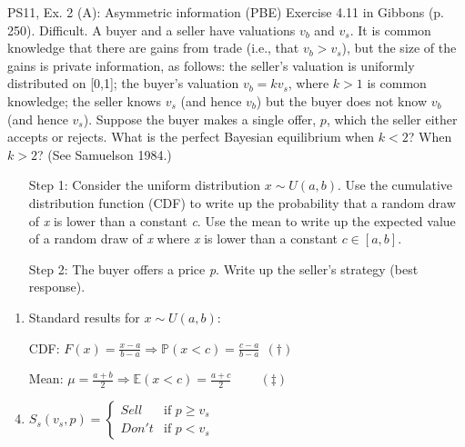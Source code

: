 \begin{frame}{PS11, Ex. 2 (A): Asymmetric information (PBE)}
    Exercise 4.11 in Gibbons (p. 250). Difficult. A buyer and a seller have valuations $v_b$ and $v_s$. It is common knowledge that there are gains from trade (i.e., that $v_b > v_s$), but the size of the gains is private information, as follows: the seller’s valuation is uniformly distributed on [0,1]; the buyer’s valuation $v_b = kv_s$, where $k > 1$ is common knowledge; the seller knows $v_s$ (and hence $v_b$) but the buyer does not know $v_b$ (and hence $v_s$). Suppose the buyer makes a single offer, $p$, which the seller either accepts or rejects. What is the perfect Bayesian equilibrium when $k < 2$? When $k > 2$? (See Samuelson 1984.) \vspace{-8pt}
    \begin{multicols}{2}
      \begin{itemize}
        \item[Step 1:] Consider the uniform distribution $x\sim U(a, b)$. Use the cumulative distribution function (CDF) to write up the probability that a random draw of \textit{x} is lower than a constant \textit{c}. Use the mean to write up the expected value of a random draw of \textit{x} where \textit{x} is lower than a constant $c\in[a,b]$.
        \item[Step 2:] The buyer offers a price \textit{p}. Write up the seller's strategy (best response).
      \end{itemize}
      \vfill\null\columnbreak
      \begin{enumerate}
        \item Standard results for $x\sim U(a, b):$
        \item[CDF:] $F(x)=\frac{x-a}{b-a}\Rightarrow\mathbb{P}(x<c)=\frac{c-a}{b-a}\ \ (\dagger)$
        \item[Mean:] $\mu=\frac{a+b}{2}\Rightarrow\mathbb{E}(x<c)=\frac{a+c}{2}\quad\quad\ (\ddagger)$
        \item $S_s(v_s,p)=\left\{\begin{array}{ll}
          Sell  & \text{if }p\geq v_s \\
          Don't & \text{if }p < v_s
        \end{array}\right.$
      \end{enumerate}
      \vfill\null
    \end{multicols}
\end{frame}
